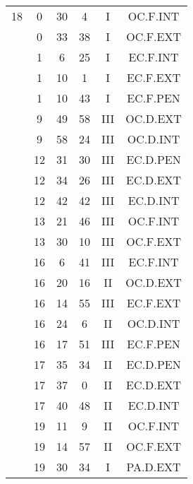 \documentclass[12pt, a4paper]{article}
\begin{document}
\begin{multicols}{3}
{\begin{tabular}{c c c c c c}
	 	 	 	18 & 0 & 30 & 4 & I & OC.F.INT\\%
	 	 	 	 & 0 & 33 & 38 & I & OC.F.EXT\\%
	 	 	 	 & 1 & 6 & 25 & I & EC.F.INT\\%
	 	 	 	 & 1 & 10 & 1 & I & EC.F.EXT\\%
	 	 	 	 & 1 & 10 & 43 & I & EC.F.PEN\\%
	 	 	 	 & 9 & 49 & 58 & III & OC.D.EXT\\%
	 	 	 	 & 9 & 58 & 24 & III & OC.D.INT\\%
	 	 	 	 & 12 & 31 & 30 & III & EC.D.PEN\\%
	 	 	 	 & 12 & 34 & 26 & III & EC.D.EXT\\%
	 	 	 	 & 12 & 42 & 42 & III & EC.D.INT\\%
	 	 	 	 & 13 & 21 & 46 & III & OC.F.INT\\%
	 	 	 	 & 13 & 30 & 10 & III & OC.F.EXT\\%
	 	 	 	 & 16 & 6 & 41 & III & EC.F.INT\\%
	 	 	 	 & 16 & 20 & 16 & II & OC.D.EXT\\%
	 	 	 	 & 16 & 14 & 55 & III & EC.F.EXT\\%
	 	 	 	 & 16 & 24 & 6 & II & OC.D.INT\\%
	 	 	 	 & 16 & 17 & 51 & III & EC.F.PEN\\%
	 	 	 	 & 17 & 35 & 34 & II & EC.D.PEN\\%
	 	 	 	 & 17 & 37 & 0 & II & EC.D.EXT\\%
	 	 	 	 & 17 & 40 & 48 & II & EC.D.INT\\%
	 	 	 	 & 19 & 11 & 9 & II & OC.F.INT\\%
	 	 	 	 & 19 & 14 & 57 & II & OC.F.EXT\\%
	 	 	 	 & 19 & 30 & 34 & I & PA.D.EXT\\%

\end{tabular}}
\end{multicols}
\end{document}
